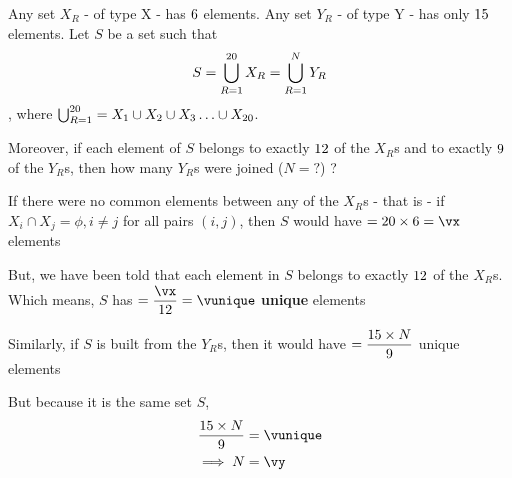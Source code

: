 

\MULTIPLY\va\vc\vx
\DIVIDE\vx\vd\vunique
\MULTIPLY\vunique\ve\a
\DIVIDE\a\vb\vy

\question Any set $X_R$ - of type X - has $6$ elements. Any set $Y_R$ - of type Y - has only $15$ elements. 
Let $S$ be a set such that
    \[ S = \bigcup_{R=1}^{20} X_R = \bigcup_{R=1}^N Y_R\], 
where $\bigcup_{R=1}^{20} = X_1\cup X_2\cup X_3 \ldots\cup X_{20}$.

Moreover, if each element of $S$ belongs to exactly $12$ of the $X_R$s and to exactly 
$9$ of the $Y_R$s, then how many $Y_R$s were joined ($N=?$) ? 

\watchout[-4cm]

\ifprintanswers
\fi 

\begin{solution}
  If there were no common elements between any of the $X_R$s - that is - 
  if $X_i\cap X_j = \phi,i\neq j$ for all pairs $(i,j)$, then $S$ would have 
  $=\vc\times\va = \vx$ elements

  But, we have been told that each element in $S$ belongs to exactly $12$ of the $X_R$s.
  Which means, $S$ has $ =\dfrac\vx\vd = \vunique$ \textbf{unique} elements

  Similarly, if $S$ is built from the $Y_R$s, then it would have $=\dfrac{15\times N}{9}$ 
  unique elements 

  But because it is the same set $S$, 
  \begin{align}
    \dfrac{\vb\times N}{\ve} &= \vunique \\
    \implies N &= \vy
  \end{align}
\end{solution}

